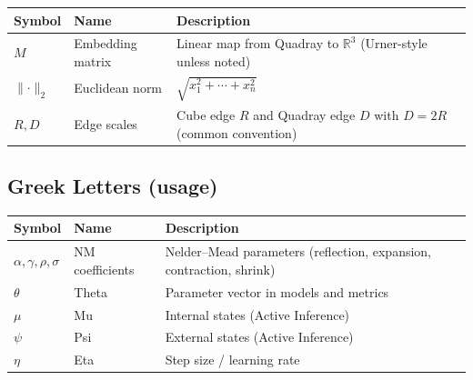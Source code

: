 \documentclass[
  10pt,
]{article}
\newcounter{none} %
\begin{document}
{\def\LTcaptype{none} %
\begin{longtable}[]{@{}
  >{\raggedright\arraybackslash}p{}
  >{\raggedright\arraybackslash}p{}
  >{\raggedright\arraybackslash}p{}@{}}
\toprule\noalign{}
\begin{minipage}[b]{\linewidth}\raggedright
Symbol
\end{minipage} & \begin{minipage}[b]{\linewidth}\raggedright
Name
\end{minipage} & \begin{minipage}[b]{\linewidth}\raggedright
Description
\end{minipage} \\
\midrule\noalign{}
\endhead
\bottomrule\noalign{}
\endlastfoot
\(M\) & Embedding matrix & Linear map from Quadray to \(\mathbb{R}^3\)
(Urner-style unless noted) \\
\(\lVert\cdot\rVert_2\) & Euclidean norm &
\(\sqrt{x_1^2+\cdots+x_n^2}\) \\
\(R, D\) & Edge scales & Cube edge \(R\) and Quadray edge \(D\) with
\(D=2R\) (common convention) \\
\end{longtable}
}

\subsection{Greek Letters (usage)}\label{greek-letters-usage}

{\def\LTcaptype{none} %
\begin{longtable}[]{@{}
  >{\raggedright\arraybackslash}p{}
  >{\raggedright\arraybackslash}p{}
  >{\raggedright\arraybackslash}p{}@{}}
\toprule\noalign{}
\begin{minipage}[b]{\linewidth}\raggedright
Symbol
\end{minipage} & \begin{minipage}[b]{\linewidth}\raggedright
Name
\end{minipage} & \begin{minipage}[b]{\linewidth}\raggedright
Description
\end{minipage} \\
\midrule\noalign{}
\endhead
\bottomrule\noalign{}
\endlastfoot
\(\alpha,\gamma,\rho,\sigma\) & NM coefficients & Nelder--Mead
parameters (reflection, expansion, contraction, shrink) \\
\(\theta\) & Theta & Parameter vector in models and metrics \\
\(\mu\) & Mu & Internal states (Active Inference) \\
\(\psi\) & Psi & External states (Active Inference) \\
\(\eta\) & Eta & Step size / learning rate \\
\end{longtable}
}
\end{document}
